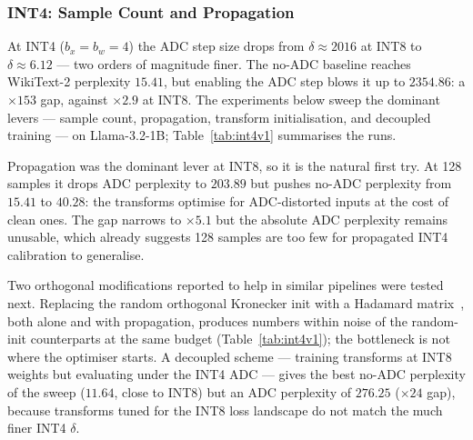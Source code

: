 \documentclass[a4paper,11pt,oneside]{article}
\theoremstyle{breakstyle}
\begin{document}

  \subsubsection{INT4: Sample Count and Propagation}
  \label{sec:int4_samples}

  At INT4 ($b_x = b_w = 4$) the ADC step size drops from
  $\delta \approx 2016$ at INT8 to $\delta \approx 6.12$ --- two
  orders of magnitude finer.  The no-ADC baseline reaches WikiText-2
  perplexity $15.41$, but enabling the ADC step blows it up to
  $2354.86$: a $\times 153$ gap, against $\times 2.9$ at INT8.  The
  experiments below sweep the dominant levers --- sample count,
  propagation, transform initialisation, and decoupled training ---
  on Llama-3.2-1B; Table~\ref{tab:int4v1} summarises the runs.

  Propagation was the dominant lever at INT8, so it is the natural
  first try.  At 128 samples it drops ADC perplexity to $203.89$ but
  pushes no-ADC perplexity from $15.41$ to $40.28$: the transforms
  optimise for ADC-distorted inputs at the cost of clean ones.  The
  gap narrows to $\times 5.1$ but the absolute ADC perplexity remains
  unusable, which already suggests 128 samples are too few for
  propagated INT4 calibration to generalise.

  Two orthogonal modifications reported to help in similar pipelines
  were tested next.  Replacing the random orthogonal Kronecker init
  with a Hadamard matrix~\cite{QuaRot2024}, both alone and with
  propagation, produces numbers within noise of the random-init
  counterparts at the same budget (Table~\ref{tab:int4v1}); the
  bottleneck is not where the optimiser starts.  A decoupled scheme
  --- training transforms at INT8 weights but evaluating under the
  INT4 ADC --- gives the best no-ADC perplexity of the sweep
  ($11.64$, close to INT8) but an ADC perplexity of $276.25$
  ($\times 24$ gap), because transforms tuned for the INT8 loss
  landscape do not match the much finer INT4 $\delta$.
\end{document}
